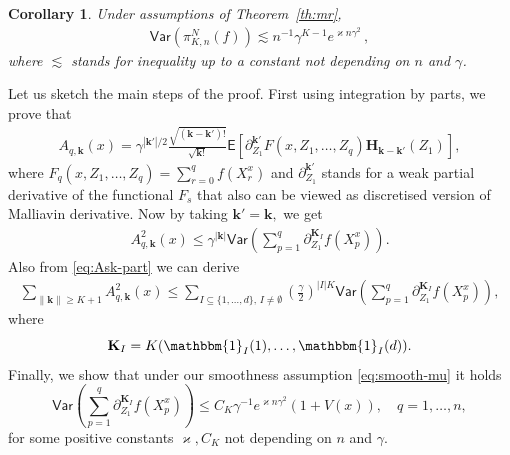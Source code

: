 \documentclass[bj]{imsart}
\def\PVar{\mathsf{Var}}
\newtheorem{cor}{Corollary}
\newcommand{\indi}[1]{\mathbbm{1}_{#1}}
\def\eqsp{\,}
\begin{document}
\begin{cor}
Under assumptions of Theorem~\ref{th:mr},
\begin{eqnarray}
\label{eq:var-bound}
\PVar\left(\pi_{K,n}^{N}(f)\right)\lesssim n^{-1} \gamma^{K-1}  e^{\varkappa n\gamma^2}
\eqsp,
\end{eqnarray}
where $\lesssim$ stands for inequality up to a constant not depending  on $n$ and $\gamma$.
\end{cor}
Let us sketch the main steps of the proof. First using integration by parts, we prove that
\begin{eqnarray}
\label{eq:Ask-part}
A_{q,\mathbf{k}}(x)=\gamma^{|\mathbf{k}'|/2}\frac{\sqrt{(\mathbf{k}-\mathbf{k}')!}}{\sqrt{\mathbf{k}!}}\mathsf{E}\left[ \partial_{Z_1}^{\mathbf{k}'} F(x,Z_1,\ldots,Z_q) \mathbf{H}_{\mathbf{k}-\mathbf{k}'}(Z_{1})\right],
\end{eqnarray}
where $F_q(x,Z_1,\ldots,Z_q)=\sum_{r=0}^q f(X^x_r)$ and $\partial_{Z_1}^{\mathbf{k}'}$
stands for a weak partial derivative of the functional $F_s$ that also can be viewed as discretised version of Malliavin derivative. 
Now by taking $\mathbf{k}'=\mathbf{k},$ we get
\begin{eqnarray*}
A^2_{q,\mathbf{k}}(x)\leq \gamma^{|\mathbf{k}|} \PVar \left( \sum_{p=1}^{q}\partial_{Z_{1}}^{\mathbf{K}_I}f\left(X_{p}^x\right)
\right).
\end{eqnarray*}
Also from \eqref{eq:Ask-part} we can derive
\begin{eqnarray*}
\sum_{\|\mathbf{k}\|\geq K+1} A^2_{q,\mathbf{k}}(x)\leq \sum_{I\subseteq\{1,\ldots,d\},\, I\neq \emptyset}
\left(\frac{\gamma}{2}\right)^{|I|K}
\PVar \left( \sum_{p=1}^{q}\partial_{Z_{1}}^{\mathbf{K}_I}f\left(X_{p}^x\right)
\right),
\end{eqnarray*}
where 
\[
\mathbf{\mathbf{K}}_{I}=K(\indi{I}(1),\ldots, \indi{I}(d)).
\]
Finally, we show  that under our smoothness assumption \eqref{eq:smooth-mu} it holds
\begin{equation}
\label{eq:varboundV}
\PVar \left(\sum_{p=1}^{q}\partial_{Z_{1}}^{\mathbf{K}_I}f\left(X^x_{p}\right)
\right)\leq C_{K}\gamma^{-1}e^{\varkappa n\gamma^2}(1+V(x)),\quad q=1,\ldots,n,
\end{equation}
for some positive constants $\varkappa, C_K$ not depending on $n$ and  $\gamma.$ 
\end{document}
